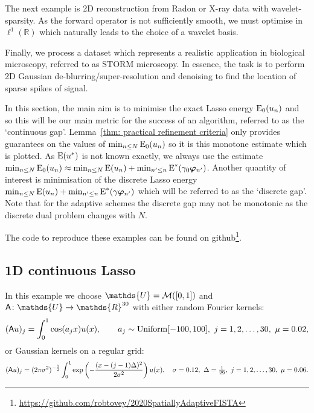 \documentclass[smallextended]{svjour3}
\let\F\mathds\let\C\mathcal\newcommand{\R}{\F{R}}\newcommand{\A}{\tens{A}}
\newcommand{\op}[1]{\operatorname{#1}}
\newcommand{\1}{\F{1}}
\newcommand*{\varf}[1]{%
	\IfEqCase{#1}{%
		{0}{u}%
		{1}{v}%
		{2}{w}%
	}[u#1]%
}
\newcommand*{\spcf}[1]{%
	\IfEqCase{#1}{%
		{0}{\F{U}}%
		{1}{\F{V}}%
		{2}{\F{W}}%
	}[\F{U}#1]%
}
\newcommand*{\vard}[1]{%
	\IfEqCase{#1}{%
		{0}{\varphi}%
		{1}{\psi}%
	}[\varphi #1]%
}
\newcommand*{\varx}[1]{%
	\IfEqCase{#1}{%
		{0}{x}%
		{1}{y}%
		{2}{z}%
		{3}{r}%
	}[x#1]%
}
\newcommand*{\vars}[1]{%
	\IfEqCase{#1}{%
		{0}{\alpha}%
		{1}{\beta}%
		{2}{\gamma}%
		{3}{a}%
		{4}{b}%
		{5}{c}%
	}[k#1]%
}
\newcommand*{\vvard}[1]{\vec{\vard{#1}}}
\begin{document}
	The next example is 2D reconstruction from Radon or X-ray data with wavelet-sparsity. As the forward operator is not sufficiently smooth, we must optimise in $\ell^1(\R)$ which naturally leads to the choice of a wavelet basis. 
	
	Finally, we process a dataset which represents a realistic application in biological microscopy, referred to as STORM microscopy. In essence, the task is to perform 2D Gaussian de-blurring/super-resolution and denoising to find the location of sparse spikes of signal.
	
	In this section, the main aim is to minimise the exact Lasso energy $\op{E}_0(\varf0_n)$ and so this will be our main metric for the success of an algorithm, referred to as the `continuous gap'. Lemma~\ref{thm: practical refinement criteria} only provides guarantees on the values of $\min_{n\leq N}\op{E}_0(\varf0_n)$ so it is this monotone estimate which is plotted. As $\op{E}(\varf0^*)$ is not known exactly, we always use the estimate $\min_{n\leq N}\op{E}_0(\varf0_n) \approx \min_{n\leq N}\op{E}(\varf0_n) + \min_{n'\leq n}\op{E}^*(\vars2_0\vvard0_{n'})$. Another quantity of interest is minimisation of the discrete Lasso energy $\min_{n\leq N}\op{E}(\varf0_n) + \min_{n'\leq n}\op{E}^*(\vars2\vvard0_{n'})$ which will be referred to as the `discrete gap'. Note that for the adaptive schemes the discrete gap may not be monotonic as the discrete dual problem changes with $N$.
	
	The code to reproduce these examples can be found on github\footnote{\href{https://github.com/robtovey/2020SpatiallyAdaptiveFISTA}{https://github.com/robtovey/2020SpatiallyAdaptiveFISTA}}.
	
	
	\subsection{1D continuous Lasso}\label{sec: 1D Lasso examples}
	In this example we choose $\spcf0=\C M([0,1])$ and $\A\colon \spcf0\to \R^{30}$ with either random Fourier kernels:
	\begin{equation}
		(\A\varf0)_j = \int_0^1\cos(\vars3_j\varx0)\varf0(\varx0), \qquad \vars3_j\sim \op{Uniform}[-100,100],\ j=1,2,\ldots,30,\ \mu =0.02, 
	\end{equation}
	or Gaussian kernels on a regular grid:
	\begin{equation}
		(\A\varf0)_j = (2\pi\sigma^2)^{-\frac12}\int_0^1\exp\left(-\frac{(\varx0-(j-1)\Delta)^2}{2\sigma^2}\right)\varf0(\varx0), \quad \sigma=0.12,\ \Delta = \tfrac1{29},\ j=1,2,\ldots,30,\ \mu=0.06.
	\end{equation}
	
\end{document}

